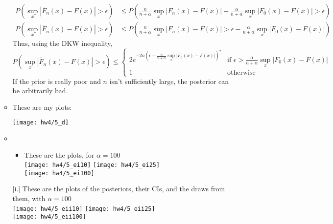 \documentclass[11pt]{article}
\theoremstyle{definition}
\begin{document}
\begin{itemize}
\begin{itemize}
\begin{align*}
                        P\left(\sup_x\left\vert \bar F_n(x)-F(x)\right\vert>\epsilon\right) &\leq P\left(\frac{n}{n+\alpha}\sup_x\left\vert F_n(x)-F(x)\right\vert + \frac{\alpha}{n+\alpha}\sup_x\left\vert F_0(x)-F(x)\right\vert>\epsilon\right) \\
                        P\left(\sup_x\left\vert \bar F_n(x)-F(x)\right\vert>\epsilon\right) &\leq P\left(\frac{n}{n+\alpha}\sup_x\left\vert F_n(x)-F(x)\right\vert>\epsilon - \frac{\alpha}{n+\alpha}\sup_x\left\vert F_0(x)-F(x)\right\vert\right)
                    \end{align*}
                    Thus, using the DKW inequality,
                    \[ P\left(\sup_x\left\vert \bar F_n(x)-F(x)\right\vert>\epsilon\right)\leq 
                        \begin{cases}
                            2e^{-2n\left(\epsilon - \frac{\alpha}{n+\alpha}\sup_x\left\vert F_0(x)-F(x)\right\vert \right)^2} & \text{if } \epsilon > \frac{\alpha}{n+\alpha}\sup_x\left\vert F_0(x)-F(x)\right\vert \\
                            1 & \text{otherwise}
                        \end{cases}
                    \]
                    If the prior is really poor and $n$ isn't sufficiently large, the posterior can be arbitrarily bad.

                \item[(d)] These are my plots:
                    \begin{center}
                        \texttt{[image: hw4/5\_d]} 
                    \end{center}
                \item[(e)] 
                    \begin{itemize}
                        \item[i.] These are the plots, for $\alpha=100$ \\
                            \texttt{[image: hw4/5\_ei10]} 
                            \texttt{[image: hw4/5\_ei25]}  \\
                            \texttt{[image: hw4/5\_ei100]}
                    \end{itemize}[i.] These are the plots of the posteriors, their CIs, and the draws from them, with $\alpha=100$ \\
                            \texttt{[image: hw4/5\_eii10]} 
                            \texttt{[image: hw4/5\_eii25]}  \\
                            \texttt{[image: hw4/5\_eii100]}
        \end{itemize}
        
        
                    

        

        
\end{itemize}
\end{document}
